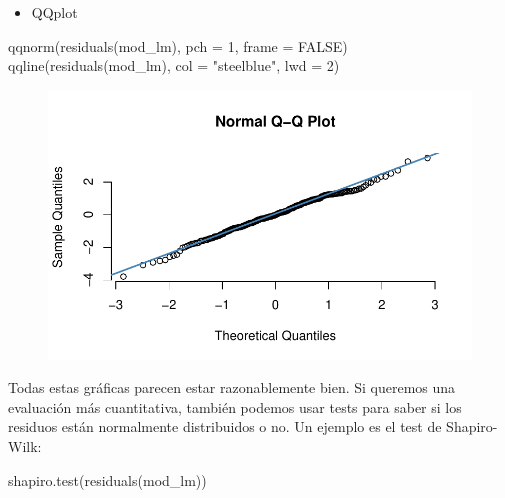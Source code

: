 \documentclass[
  letterpaper,
  DIV=11,
  numbers=noendperiod]{scrreprt}
\newenvironment{Shaded}{\begin{snugshade}}{\end{snugshade}}
\newcommand{\AttributeTok}[1]{\textcolor[rgb]{0.40,0.45,0.13}{#1}}
\newcommand{\ConstantTok}[1]{\textcolor[rgb]{0.56,0.35,0.01}{#1}}
\newcommand{\DecValTok}[1]{\textcolor[rgb]{0.68,0.00,0.00}{#1}}
\newcommand{\FunctionTok}[1]{\textcolor[rgb]{0.28,0.35,0.67}{#1}}
\newcommand{\NormalTok}[1]{\textcolor[rgb]{0.00,0.23,0.31}{#1}}
\newcommand{\StringTok}[1]{\textcolor[rgb]{0.13,0.47,0.30}{#1}}
\providecommand{\tightlist}{%
  \setlength{\itemsep}{0pt}\setlength{\parskip}{0pt}}\usepackage{longtable,booktabs,array}
\begin{document}
\begin{itemize}
\tightlist
\item
  QQplot
\end{itemize}

\begin{Shaded}
\begin{Highlighting}[]
\FunctionTok{qqnorm}\NormalTok{(}\FunctionTok{residuals}\NormalTok{(mod\_lm), }\AttributeTok{pch =} \DecValTok{1}\NormalTok{, }\AttributeTok{frame =} \ConstantTok{FALSE}\NormalTok{)}
\FunctionTok{qqline}\NormalTok{(}\FunctionTok{residuals}\NormalTok{(mod\_lm), }\AttributeTok{col =} \StringTok{"steelblue"}\NormalTok{, }\AttributeTok{lwd =} \DecValTok{2}\NormalTok{)}
\end{Highlighting}
\end{Shaded}

\begin{figure}[H]

{\centering \includegraphics{01_RegresionLineal_files/figure-pdf/unnamed-chunk-34-1.pdf}

}

\end{figure}

Todas estas gráficas parecen estar razonablemente bien. Si queremos una
evaluación más cuantitativa, también podemos usar tests para saber si
los residuos están normalmente distribuidos o no. Un ejemplo es el test
de Shapiro-Wilk:

\begin{Shaded}
\begin{Highlighting}[]
\FunctionTok{shapiro.test}\NormalTok{(}\FunctionTok{residuals}\NormalTok{(mod\_lm))}
\end{Highlighting}
\end{Shaded}
\end{document}
